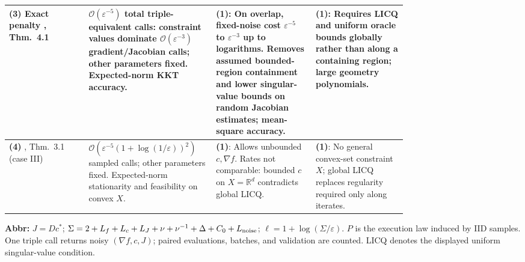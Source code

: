 \begin{table}[tp]
\begin{threeparttable}
\begin{tabularx}{\linewidth}{@{}>{\raggedright\arraybackslash}p{0.20\linewidth}>{\raggedright\arraybackslash}p{0.32\linewidth}>{\raggedright\arraybackslash}p{0.25\linewidth}>{\raggedright\arraybackslash}X@{}}
\midrule
\textbf{(3)} Exact penalty \citep{cui2025penaltyNov}, Thm.~4.1 & $\mathcal{O}(\varepsilon^{-5})$ total triple-equivalent calls: constraint values dominate $\mathcal{O}(\varepsilon^{-3})$ gradient/Jacobian calls; other parameters fixed. Expected-norm KKT accuracy. & \textbf{(1)}: On overlap, fixed-noise cost $\varepsilon^{-5}$ to $\varepsilon^{-3}$ up to logarithms. Removes assumed bounded-region containment and lower singular-value bounds on random Jacobian estimates; mean-square accuracy. & \textbf{(1)}: Requires LICQ and uniform oracle bounds globally rather than along a containing region; large geometry polynomials. \\
\midrule
\textbf{(4)} \citep{alacaoglu2023singleV1}, Thm.~3.1 (case III) & $\mathcal{O}(\varepsilon^{-5}(1+\log(1/\varepsilon))^2)$ sampled calls; other parameters fixed. Expected-norm stationarity and feasibility on convex $X$. & \textbf{(1)}: Allows unbounded $c,\nabla f$. Rates not comparable: bounded $c$ on $X=\mathbb R^d$ contradicts global LICQ. & \textbf{(1)}: No general convex-set constraint $X$; global LICQ replaces regularity required only along iterates. \\
\bottomrule
\end{tabularx}
\begin{tablenotes}[flushleft]\footnotesize
\item[] \textbf{Abbr:} $J=Dc^*$; $\Sigma=2+L_f+L_c+L_J+\nu+\nu^{-1}+\Delta+C_0+L_{\rm noise}$; $\ell=1+\log(\Sigma/\varepsilon)$. $P$ is the execution law induced by IID samples. One triple call returns noisy $(\nabla f,c,J)$; paired evaluations, batches, and validation are counted. LICQ denotes the displayed uniform singular-value condition.
\end{tablenotes}
\end{threeparttable}
\end{table}
\clearpage
